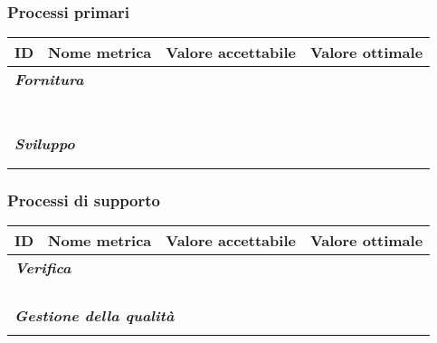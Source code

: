 \documentclass[10pt, a4paper]{article}
\begin{document}
\subsubsection{Processi primari}
    {\renewcommand{\arraystretch}{1.5}
    \begin{tabularx}{\textwidth}{p{}|p{}|X|X}
    \textbf{ID} & \textbf{Nome metrica} & \textbf{Valore accettabile} & \textbf{Valore ottimale}  \\
    \hline
    \multicolumn{4}{l}{\cellcolor{primarycolor}\textbf{\textit{Fornitura}}} \\
    \hline
     &  &  &  \\
    \hline
     &  &  &  \\
    \hline
     &  &  &  \\
    \hline
     &  &  &  \\
    \hline
     &  &  &  \\
    \hline
     &  &  &  \\
    \hline
     &  &  &  \\
    \hline
    \multicolumn{4}{l}{\cellcolor{primarycolor}\textbf{\textit{Sviluppo}}} \\
    \hline
     &  &  &  \\
    \hline
     &  &  &  \\
    \end{tabularx}}
   
\subsubsection{Processi di supporto}
    {\renewcommand{\arraystretch}{1.5}
    \begin{tabularx}{\textwidth}{p{}|p{}|X|X}
    \textbf{ID} & \textbf{Nome metrica} & \textbf{Valore accettabile} & \textbf{Valore ottimale}  \\
    \hline
    \multicolumn{4}{l}{\cellcolor{primarycolor}\textbf{\textit{Verifica}}} \\
    \hline
     &  &  &  \\
    \hline
     &  &  &  \\
    \hline
     &  &  &  \\
    \hline
     &  &  &  \\
    \hline
    \multicolumn{4}{l}{\cellcolor{primarycolor}\textbf{\textit{Gestione della qualità}}} \\
    \hline
     &  &  &  \\
    \end{tabularx}}    
    
\end{document}
